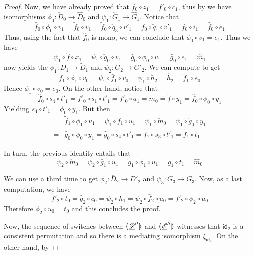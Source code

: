 \documentclass[a4paper,UKenglish,cleveref,pdftex,thm-restate,numberwithinsect]{lipics-v2021}
\newcommand{\id}[1]{\mathsf{id}_{#1}}
\newcommand{\dder}[1]{\mathscr{#1}}
\newcommand{\der}[1]{\underline{\dder{#1}}}
\newcommand{\lpro}{\langle \hspace{-1.85pt}[}
\newcommand{\rpro}{]\hspace{-1.85pt}\rangle}
\begin{document}
\begin{proof}
	Now, we have already proved that $f_0\circ z_1=f'_0\circ c_1$, thus by  we have isomorphisms $\phi_{0}\colon \check{D}_0\to \hat{D}_0$ and $\psi_{1}\colon \check{G}_1\to \hat{G}_1$.
	Notice that
	\[
	\hat{f}_0\circ \phi_{0}\circ v_1  = \check{f}_0\circ v_1 =\check{f}_0\circ \check{q}_3\circ v'_1=f_0\circ \check{q}_1\circ v'_1=f_0\circ i_1=\hat{f}_0\circ e_1\]
	Thus, using the fact that $\hat{f}_0$ is mono, we can conclude that $\phi_0\circ v_1=e_1$. Thus we have
	\[\psi_1\circ \mathring{f}\circ x_1=\psi_1\circ \check{g}_0\circ v_1= \hat{g}_0\circ \phi_0\circ v_1=\hat{g}_0\circ e_1=\hat{m}_1 \]
	 now yields the $\phi_1\colon \bar{D}_1\to\tilde{D}_1$ and $\psi_2\colon \bar{G}_2\to G'_2$.  We can compute to get
	\[
	\tilde{f}_1\circ \phi_1\circ v_0=\psi_1\circ \bar{f}_1\circ v_0=\psi_1\circ \mathring{h}_2=\hat{h}_2=\tilde{f}_1\circ e_0\]
	Hence $\phi_1\circ v_0=e_0$. On the other hand, notice that
	\[\hat{f}_0\circ s_4\circ t'_1=f'_0\circ s_1\circ t'_1=f'_0\circ a_1=m_0=\check{f}\circ y_1=\hat{f}_0\circ \phi_0\circ y_1\]
	Yielding $s_4\circ t'_1=\phi_0\circ y_1$. But then
	\begin{align*}
		&\tilde{f}_1\circ \phi_1\circ u_1=\psi_1\circ \bar{f}_1\circ u_1=\psi_1\circ \check{m}_0= \psi_1\circ \check{g}_0\circ y_1\\=&\hat{g}_0\circ \phi_0\circ y_1=\hat{g}_0\circ s_4\circ t'_1=\tilde{f}_1\circ s_3\circ t'_1=\tilde{f}_1\circ t_1 
	\end{align*}
	
	In turn, the previous identity entails that
	\[\psi_2\circ \mathring{m}_0=\psi_2\circ \bar{g}_1\circ u_1 = \tilde{g}_1\circ \phi_1\circ u_1 = \tilde{g}_1\circ t_1=\hat{m}_0\]
	
	We can use  a third time to get $\phi_2\colon \bar{D}_2\to D'_2$ and $\psi_3\colon G_3\to G_3$.  Now, as a last computation, we have
	\[f'_2\circ t_0= \hat{g}_2\circ c_0=\psi_2\circ h_1=\psi_2\circ \bar{f}_2\circ u_0=f'_2\circ \phi_2\circ u_0\]
	Therefore $\phi_2\circ u_0=t_0$ and this concludes the proof.
	
Now, the sequence of switches between $\lpro \der{D}''\rpro$ and  $\lpro \der{E}'' \rpro$  witnesses that $\id{2}$ is a consistent permutation and so there is a mediating isomorphism $\xi_{\id{2}}$. On the other hand, by 
	
\end{proof}
\end{document}
